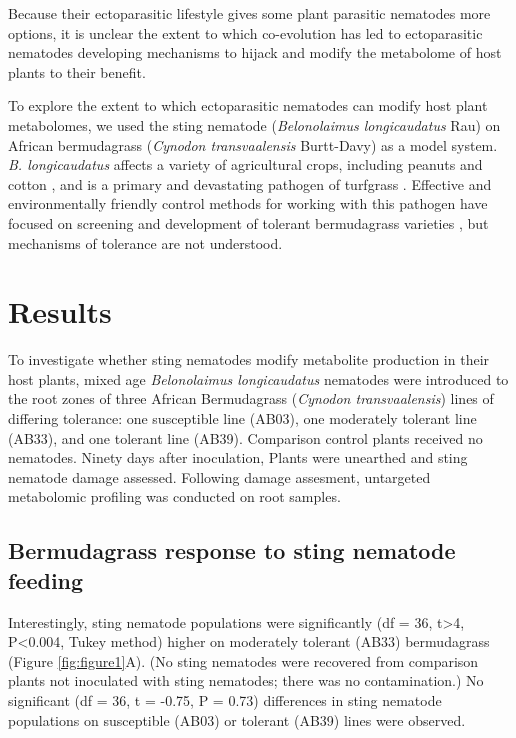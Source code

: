 \documentclass[9pt,lineno]{elife}
\begin{document}
Because their ectoparasitic lifestyle gives some plant parasitic nematodes more options, it is unclear the extent to which co-evolution has led to ectoparasitic nematodes developing mechanisms to hijack and modify the metabolome of host plants to their benefit.  

To explore the extent to which ectoparasitic nematodes can modify host plant metabolomes, we used the sting nematode (\textit{Belonolaimus longicaudatus} Rau) on African bermudagrass  (\textit{Cynodon transvaalensis} Burtt-Davy) as a model system.  \textit{B. longicaudatus} affects a variety of agricultural crops, including peanuts and cotton \citep{kutsuwa2015belonolaimus,crow2000yield}, and is a primary and devastating pathogen of turfgrass \citep{shaver2017damage, bekal2000population}.   Effective and environmentally friendly control methods for working with this pathogen have focused on screening and development of tolerant bermudagrass varieties \citep{pang2011bermudagrass,pang2011screening}, but mechanisms of tolerance are not understood. 

\section{Results}

To investigate whether sting nematodes modify metabolite production in their host plants, mixed age \textit{Belonolaimus longicaudatus} nematodes were introduced to the root zones of three African Bermudagrass (\textit{Cynodon transvaalensis}) lines of differing tolerance: one susceptible line (AB03), one moderately tolerant line (AB33), and one tolerant line (AB39).  Comparison control plants received no nematodes.  Ninety days after inoculation,  Plants were unearthed and sting nematode damage assessed.  Following damage assesment, untargeted metabolomic profiling was conducted on root samples.  

\subsection{Bermudagrass response to sting nematode feeding}
Interestingly, sting nematode populations were significantly (df = 36, t>4, P<0.004, Tukey method) higher on moderately tolerant (AB33) bermudagrass (Figure \ref{fig:figure1}A).  (No sting nematodes were recovered from comparison plants not inoculated with sting nematodes; there was no contamination.)  No significant (df = 36, t = -0.75, P = 0.73) differences in sting nematode populations on susceptible (AB03) or tolerant (AB39) lines were observed.  
\end{document}
